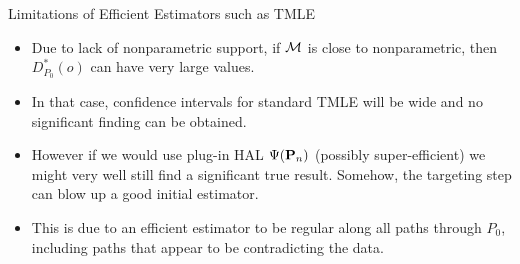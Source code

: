 \documentclass[t]{beamer}
\newlength{\wideitemsep}
\let\olditem\item
\renewcommand{\item}{\setlength{\itemsep}{\wideitemsep}\olditem}
\begin{document}
\begin{frame}{Limitations of Efficient Estimators such as TMLE}
\begin{itemize}
\item Due to lack of nonparametric support, if ${\cal M}$ is close to nonparametric, then
$D^*_{P_0}(o)$ can have very large values.
\item In that case, confidence intervals for standard TMLE will be wide and no significant finding can be obtained.
\item However if we would use plug-in HAL $\Psi({\bf P}_n)$ (possibly super-efficient) we might very well still find a significant true result. Somehow, the targeting step can blow up a good initial estimator.
\item This is due to an efficient estimator to be regular along all paths through $P_0$, including paths that appear to be contradicting the data.
\end{itemize}
\end{frame}
\end{document}
